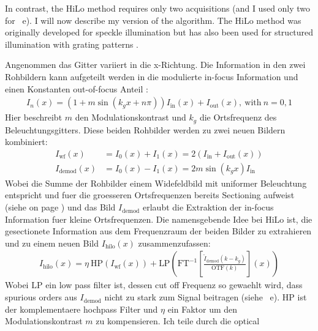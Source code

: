 In contrast, the HiLo method requires only two acquisitions (and I
used only two for ~e). I will now
describe my version of the algorithm. The HiLo method was originally
developed for speckle illumination
\citep{Ventalon2005,Ventalon2007,Lim2011} but has also been used for
structured illumination with grating patterns
\citep{Bozinovic2008a,Mertz2010}.



Angenommen das Gitter variiert in die x-Richtung.  Die Information in
den zwei Rohbildern kann aufgeteilt werden in  die
modulierte in-focus Information und einen Konstanten out-of-focus
Anteil \citep{Mertz2010}:
\begin{align}
  I_n(x) = \left(1+m\sin(k_g x + n\pi)\right) I_\textrm{in}(x) + I_\textrm{out}(x),\
  \textrm{with}\ n=0,1
\end{align}
Hier beschreibt $m$ den Modulationskontrast und $k_g$ die Ortsfrequenz
des Beleuchtungsgitters. Diese beiden Rohbilder werden zu zwei neuen
Bildern kombiniert:
\begin{align}
  I_\textrm{wf}(x) &= I_0(x)+I_1(x) = 2\left(I_\textrm{in} + I_\textrm{out}(x)\right) \\ 
  I_\textrm{demod}(x) &= I_0(x)-I_1(x) = 2 m \sin(k_g x) I_\textrm{in}  
\end{align}
Wobei die Summe der Rohbilder einem Widefeldbild mit uniformer
Beleuchtung entspricht und fuer die groesseren Ortsfrequenzen bereits
Sectioning aufweist (siehe \figref{fig:missing-cone} on page
\pageref{fig:missing-cone}) und das Bild $I_\textrm{demod}$ erlaubt
die Extraktion der in-focus Information fuer kleine
Ortsfrequenzen. Die namensgebende Idee bei HiLo ist, die gesectionete
Information aus dem Frequenzraum der beiden Bilder zu extrahieren und
zu einem neuen Bild $I_\textrm{hilo}(x)$ zusammenzufassen:
\begin{align}
  I_\textrm{hilo}(x) = \eta\ \textrm{HP}(I_\textrm{wf}(x)) + \textrm{LP}\left(\textrm{FT}^{-1}\left[\frac{\widetilde I_\textrm{demod}(k-k_g)}{\textrm{OTF}(k)}\right](x)\right)
\end{align}
Wobei $\textrm{LP}$ ein low pass filter ist, dessen cut off Frequenz
so gewaehlt wird, dass spurious orders aus $I_\textrm{demod}$ nicht zu
stark zum Signal beitragen (siehe
~e). \textrm{HP} ist der
komplementaere hochpass Filter und $\eta$ ein Faktor um den
Modulationskontrast $m$ zu kompensieren. Ich teile durch die optical
